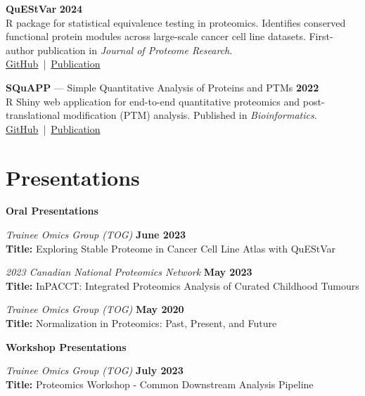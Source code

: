 \documentclass[margin,line]{res}
\begin{document}
\begin{resume}
{\bf QuEStVar} \hfill {\bf 2024}\\
R package for statistical equivalence testing in proteomics. Identifies conserved functional protein modules across large-scale cancer cell line datasets. First-author publication in {\em Journal of Proteome Research}.\\
{\small \href{https://github.com/LangeLab/Analysis_of_QuEStVar_Manuscript}{GitHub}~|~\href{https://doi.org/10.1021/acs.jproteome.4c00131}{Publication}}

{\bf SQuAPP} --- Simple Quantitative Analysis of Proteins and PTMs \hfill {\bf 2022}\\
R Shiny web application for end-to-end quantitative proteomics and post-translational modification (PTM) analysis. Published in {\em Bioinformatics}.\\
{\small \href{https://github.com/LangeLab/SQuAPP}{GitHub}~|~\href{https://doi.org/10.1093/bioinformatics/btac628}{Publication}}


\section{\sc Presentations}

%

{\bf Oral Presentations}

\vspace{-.3cm}
{\em Trainee Omics Group (TOG)} \hfill {\bf June 2023}\\
{\bf Title:} Exploring Stable Proteome in Cancer Cell Line Atlas with QuEStVar

{\em 2023 Canadian National Proteomics Network} \hfill {\bf May 2023}\\
{\bf Title:} InPACCT: Integrated Proteomics Analysis of Curated Childhood Tumours

{\em Trainee Omics Group (TOG)} \hfill {\bf May 2020}\\
{\bf Title:} Normalization in Proteomics: Past, Present, and Future

{\bf Workshop Presentations}

\vspace{-.3cm}
{\em Trainee Omics Group (TOG)} \hfill {\bf July 2023}\\
{\bf Title:} Proteomics Workshop - Common Downstream Analysis Pipeline


\end{resume}
\end{document}
